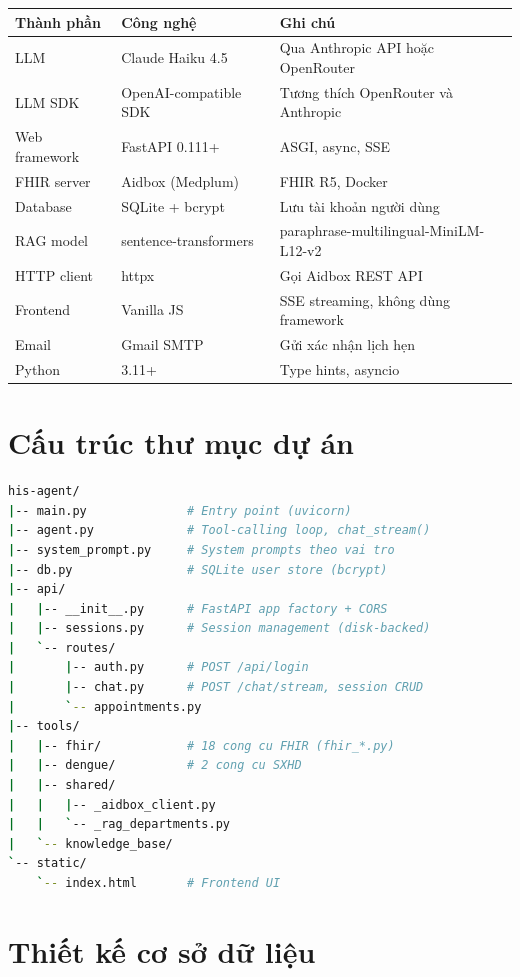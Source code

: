 \documentclass[oneside, a4paper]{book}
\theoremstyle{plain}
\theoremstyle{plain}
\theoremstyle{definition}
\theoremstyle{remark}
\begin{document}
\begin{table}[H]
\centering
\begin{tabular}{|l|l|p{6cm}|}
\hline
\textbf{Thành phần} & \textbf{Công nghệ} & \textbf{Ghi chú} \\
\hline
LLM & Claude Haiku 4.5 & Qua Anthropic API hoặc OpenRouter \\
LLM SDK & OpenAI-compatible SDK & Tương thích OpenRouter và Anthropic \\
Web framework & FastAPI 0.111+ & ASGI, async, SSE \\
FHIR server & Aidbox (Medplum) & FHIR R5, Docker \\
Database & SQLite + bcrypt & Lưu tài khoản người dùng \\
RAG model & sentence-transformers & paraphrase-multilingual-MiniLM-L12-v2 \\
HTTP client & httpx & Gọi Aidbox REST API \\
Frontend & Vanilla JS & SSE streaming, không dùng framework \\
Email & Gmail SMTP & Gửi xác nhận lịch hẹn \\
Python & 3.11+ & Type hints, asyncio \\
\hline
\end{tabular}
\end{table}

\section{Cấu trúc thư mục dự án}

\begin{lstlisting}[language=bash, caption={Cấu trúc thư mục dự án}]
his-agent/
|-- main.py              # Entry point (uvicorn)
|-- agent.py             # Tool-calling loop, chat_stream()
|-- system_prompt.py     # System prompts theo vai tro
|-- db.py                # SQLite user store (bcrypt)
|-- api/
|   |-- __init__.py      # FastAPI app factory + CORS
|   |-- sessions.py      # Session management (disk-backed)
|   `-- routes/
|       |-- auth.py      # POST /api/login
|       |-- chat.py      # POST /chat/stream, session CRUD
|       `-- appointments.py
|-- tools/
|   |-- fhir/            # 18 cong cu FHIR (fhir_*.py)
|   |-- dengue/          # 2 cong cu SXHD
|   |-- shared/
|   |   |-- _aidbox_client.py
|   |   `-- _rag_departments.py
|   `-- knowledge_base/
`-- static/
    `-- index.html       # Frontend UI
\end{lstlisting}

\section{Thiết kế cơ sở dữ liệu}
\end{document}

